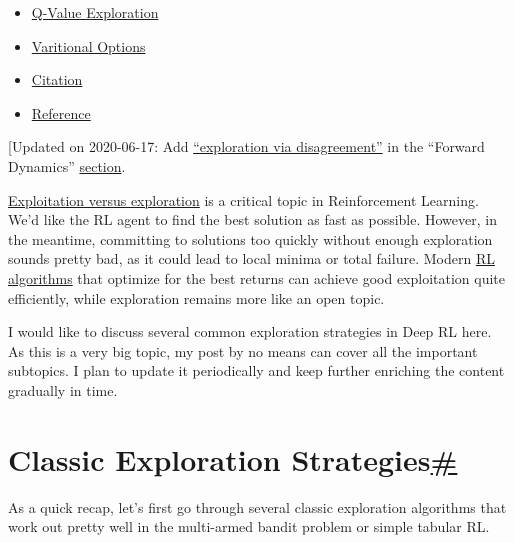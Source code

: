 \begin{itemize}
  \begin{itemize}
  \tightlist
  \item
    \hyperref[episodic-memory]{Episodic Memory}
  \item
    \hyperref[direct-exploration]{Direct Exploration}
  \end{itemize}
\item
  \hyperref[q-value-exploration]{Q-Value Exploration}
\item
  \hyperref[varitional-options]{Varitional Options}
\item
  \hyperref[citation]{Citation}
\item
  \hyperref[reference]{Reference}
\end{itemize}

{{[}Updated on 2020-06-17: Add \hyperref[exploration-via-disagreement]{``exploration via disagreement''} in the ``Forward Dynamics'' \hyperref[forward-dynamics]{section}.}

\href{https://lilianweng.github.io/posts/2018-01-23-multi-armed-bandit/}{Exploitation versus exploration} is a critical topic in Reinforcement Learning. We'd like the RL agent to find the best solution as fast as possible. However, in the meantime, committing to solutions too quickly without enough exploration sounds pretty bad, as it could lead to local minima or total failure. Modern \href{https://lilianweng.github.io/posts/2018-02-19-rl-overview/}{RL} \href{https://lilianweng.github.io/posts/2018-04-08-policy-gradient/}{algorithms} that optimize for the best returns can achieve good exploitation quite efficiently, while exploration remains more like an open topic.

I would like to discuss several common exploration strategies in Deep RL here. As this is a very big topic, my post by no means can cover all the important subtopics. I plan to update it periodically and keep further enriching the content gradually in time.

\section{\texorpdfstring{Classic Exploration Strategies\hyperref[classic-exploration-strategies]{\#}}{Classic Exploration Strategies\#}}\label{classic-exploration-strategies}

As a quick recap, let's first go through several classic exploration algorithms that work out pretty well in the multi-armed bandit problem or simple tabular RL.

